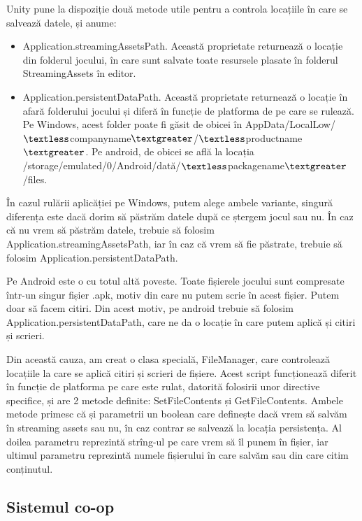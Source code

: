\documentclass[12pt, a4paper]{article}
\begin{document}
	Unity pune la dispoziție două metode utile pentru a controla locațiile în care se salvează datele, și anume:
	
	\begin{itemize}
		\item Application.streamingAssetsPath. Această proprietate returnează o locație din folderul jocului, în care sunt salvate toate resursele plasate în folderul StreamingAssets în editor.
		\item Application.persistentDataPath. Această proprietate returnează o locație în afară folderului jocului și diferă în funcție de platforma de pe care se rulează. Pe Windows, acest folder poate fi găsit de obicei în AppData/LocalLow/$\textless$companyname$\textgreater$/$\textless$productname$\textgreater$. Pe android, de obicei se află la locația \newline
		/storage/emulated/0/Android/dată/$\textless$packagename$\textgreater$/files.
	\end{itemize}
	
	În cazul rulării aplicăției pe Windows, putem alege ambele variante, singură diferența este dacă dorim să păstrăm datele după ce ștergem jocul sau nu. În caz că nu vrem să păstrăm datele, trebuie să folosim Application.streamingAssetsPath, iar în caz că vrem să fie păstrate, trebuie să folosim Application.persistentDataPath.
	\newline
	
	Pe Android este o cu totul altă poveste. Toate fișierele jocului sunt compresate într-un singur fișier .apk, motiv din care nu putem scrie în acest fișier. Putem doar să facem citiri. Din acest motiv, pe android trebuie să folosim Application.persistentDataPath, care ne da o locație în care putem aplică și citiri și scrieri.
	\newline
	
	Din această cauza, am creat o clasa specială, FileManager, care controlează locațiile la care se aplică citiri și scrieri de fișiere. Acest script funcționează diferit în funcție de platforma pe care este rulat, datorită folosirii unor directive specifice, și are 2 metode definite: SetFileContents și GetFileContents. Ambele metode primesc că și parametrii un boolean care definește dacă vrem să salvăm în streaming assets sau nu, în caz contrar se salvează la locația persistența. Al doilea parametru reprezintă strîng-ul pe care vrem să îl punem în fișier, iar ultimul parametru reprezintă numele fișierului în care salvăm sau din care citim conținutul.
	
	
	\subsection{Sistemul co-op}
	\label{section: coop}
	
\end{document}

